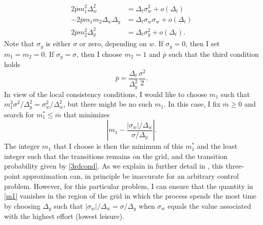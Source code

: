 \documentclass[11pt]{article}
\theoremstyle{plain}
\begin{document}
\begin{align*}
2 \overline{p} m_1^2 \Delta_w^2 & = \Delta_t \sigma_w^2 + o(\Delta_t)
\\ -2 \overline{p} m_1 m_2 \Delta_w \Delta_y & = \Delta_t \sigma_w \sigma_w + o(\Delta_t)
\\ 2 \overline{p} m_2^2 \Delta_y^2 & = \Delta_t \sigma_y^2 + o(\Delta_t).
\end{align*}
Note that $\sigma_y$ is either $\sigma$ or zero, depending on $w$. If $\sigma_y=0$, then I set $m_1=m_2=0$. If $\sigma_y = \sigma$, then I choose $m_2=1$ and $\overline{p}$ such that the third condition holds
\begin{equation} 
\overline{p} = \frac{\Delta_t}{\Delta_y^2} \frac{\sigma^2}{2}. 
\label{3rdcond} 
\end{equation} 
In view of the local consistency conditions, I would like to choose $m_1$ such that $m_1^2 \sigma^2/\Delta_y^2 = \sigma_w^2/\Delta_w^2$, but there might be no such $m_1$. In this case, I fix $\overline{m} \geq 0$ and search for $m_1^* \leq \overline{m}$ that minimizes
\begin{equation}
{\left| m_1  - \frac{|\sigma_w|/\Delta_w}{\sigma/\Delta_y} \right|}.
\label{m1}
\end{equation}
The integer $m_1$ that I choose is then the minimum of this $m^*_1$ and the least integer such that the transitions remains on the grid, and the transition probability given by \eqref{3rdcond}. As we explain in further detail in \cite{phelan_applications_2022}, this three-point approximation can, in principle be inaccurate for an arbitrary control problem. However, for this particular problem, I can ensure that the quantity in \eqref{m1} vanishes in the region of the grid in which the process spends the most time by choosing $\Delta_y$ such that $|\sigma_w|/\Delta_w = \sigma/\Delta_y$ when $\sigma_w$ equals the value associated with the highest effort (lowest leisure).  

\end{document}
